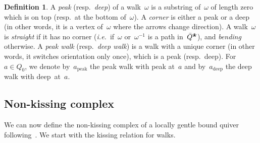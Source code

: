 \documentclass{amsart}
\theoremstyle{definition}
\newtheorem{definition}[theorem]{Definition}
\newcommand{\set}[2]{\left\{ #1 \;\middle|\; #2 \right\}} %
\newcommand{\eqdef}{\mbox{\,\raisebox{0.2ex}{\scriptsize\ensuremath{\mathrm:}}\ensuremath{=}\,}} %
\newcommand{\ie}{\textit{i.e.}~} %
\newcommand{\darkblue}{\color{darkblue}} %
\newcommand{\defn}[1]{\textsl{\darkblue #1}} %
\newcommand{\blossom}{^\text{\ding{96}}} %
\newcommand{\peak}{\mathrm{peak}} %
\newcommand{\deep}{\mathrm{deep}} %
\begin{document}
\begin{definition}
\label{def:straightBending}
A \defn{peak} (resp.~\defn{deep}) of a walk~$\omega$ is a substring of~$\omega$ of length zero which is on top (resp.~at the bottom of~$\omega$).
A \defn{corner} is either a peak or a deep (in other words, it is a vertex of~$\omega$ where the arrows change direction).
A walk~$\omega$ is \defn{straight} if it has no corner (\ie if~$\omega$ or~$\omega^{-1}$ is a path in~$\bar Q\blossom$), and \defn{bending} otherwise.
A \defn{peak walk} (resp.~\defn{deep walk}) is a walk with a unique corner (in other words, it switches orientation only once), which is a peak (resp.~deep). For~$a \in Q_0$, we denote by~$a_\peak$ the peak walk with peak at~$a$ and by~$a_\deep$ the deep walk with deep~at~$a$.
\end{definition}

\subsection{Non-kissing complex}

We can now define the non-kissing complex of a locally gentle bound quiver following~\cite{McConville, PaluPilaudPlamondon, BrustleDouvilleMousavandThomasYildirim}.
We start with the kissing relation for walks.
\end{document}
